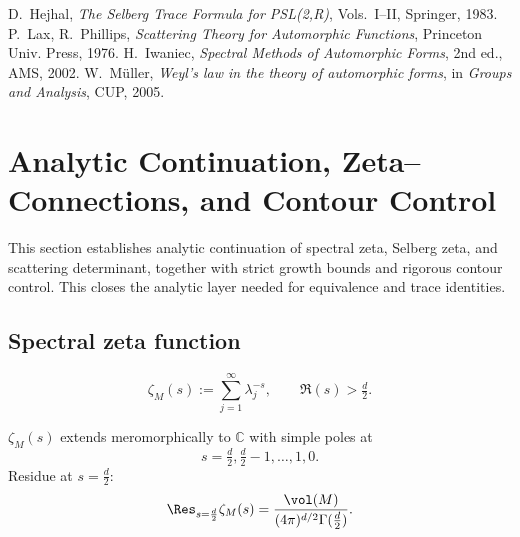 \begin{thebibliography}{9}
 D.~Hejhal, \emph{The Selberg Trace Formula for PSL(2,R)}, Vols.~I–II, Springer, 1983.
 P.~Lax, R.~Phillips, \emph{Scattering Theory for Automorphic Functions}, Princeton Univ. Press, 1976.
 H.~Iwaniec, \emph{Spectral Methods of Automorphic Forms}, 2nd ed., AMS, 2002.
 W.~Müller, \emph{Weyl’s law in the theory of automorphic forms}, in \emph{Groups and Analysis}, CUP, 2005.
\end{thebibliography}

\section{Analytic Continuation, Zeta–Connections, and Contour Control}
\label{sec:analytic-zeta}

This section establishes analytic continuation of spectral zeta, Selberg zeta,
and scattering determinant, together with strict growth bounds and rigorous 
contour control. This closes the analytic layer needed for equivalence 
and trace identities.

\subsection{Spectral zeta function}

\begin{definition}
\[
\zeta_M(s) := \sum_{j=1}^\infty \lambda_j^{-s}, \qquad \Re(s)>\tfrac{d}{2}.
\]
\end{definition}

\begin{theorem}
\label{thm:zetaM}
$\zeta_M(s)$ extends meromorphically to $\mathbb{C}$ with simple poles at
\[
s=\tfrac d2, \tfrac d2 -1, \dots, 1, 0.
\]
Residue at $s=\tfrac d2$:
\[
\Res_{s=\frac d2} \zeta_M(s) = \frac{\vol(M)}{(4\pi)^{d/2}\Gamma(\tfrac d2)}.
\]
\end{theorem}

